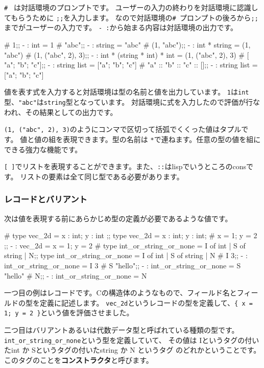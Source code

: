 \documentclass[mingoth,a4paper]{jsarticle}
\begin{document}
\verb|# | は対話環境のプロンプトです。
ユーザーの入力の終わりを対話環境に認識してもらうために \verb|;;|を入力します。
なので対話環境の\verb|# |プロンプトの後ろから\verb|;;|までがユーザーの入力です。
\verb|- :|から始まる内容は対話環境の出力です。

\begin{commandline}
# 1;;
- : int = 1
# "abc";;
- : string = "abc"
# (1, "abc");;
- : int * string = (1, "abc")
# (1, ("abc", 2), 3);;
- : int * (string * int) * int = (1, ("abc", 2), 3)
# [ "a"; "b"; "c"];;
- : string list = ["a"; "b"; "c"]
# "a" :: "b" :: "c" :: [];;
- : string list = ["a"; "b"; "c"]
\end{commandline}

値を表す式を入力すると対話環境は型の名前と値を出力しています。
\verb|1|は\verb|int|型、\verb|"abc"|は\verb|string|型となっています。
対話環境に式を入力したので評価が行なわれ、その結果としての出力です。

\verb|(1, ("abc", 2), 3)|のようにコンマで区切って括弧でくくった値はタプルです。
値と値の組を表現できます。型の名前は \verb|*|で連ねます。任意の型の値を組にできる強力な機能です。

\verb|[ ]|でリストを表現することができます。また、\verb|::|はlispでいうところのconsです。
リストの要素は全て同じ型である必要があります。

\subsubsection{レコードとバリアント}

次は値を表現する前にあらかじめ型の定義が必要であるような値です。

\begin{commandline}
# type vec_2d = { x : int; y : int };;
type vec_2d = { x : int; y : int; }
# { x = 1; y = 2 };;
- : vec_2d = {x = 1; y = 2}
# type int_or_string_or_none = I of int | S of string | N;;
type int_or_string_or_none = I of int | S of string | N
# I 3;;
- : int_or_string_or_none = I 3
# S "hello";;
- : int_or_string_or_none = S "hello"
# N;;
- : int_or_string_or_none = N
\end{commandline}

一つ目の例はレコードです。Cの構造体のようなもので、フィールド名とフィールドの型を定義に記述します。
\verb|vec_2d|というレコードの型を定義して、\verb|{ x = 1; y = 2 }|という値を評価させました。

二つ目はバリアントあるいは代数データ型と呼ばれている種類の型です。
\verb|int_or_string_or_none|という型を定義していて、
その値は Iというタグの付いたint か Sというタグの付いたstring か N というタグ のどれかということです。
このタグのことを{\bf コンストラクタ}と呼びます。
\end{document}
